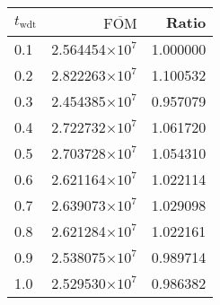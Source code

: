 \begin{tabular}{lrr}
\toprule
$t_{\mathrm{wdt}}$ & $\overline{\mathrm{FOM}}$ &    Ratio \\
\midrule
               0.1 &   2.564454$\times 10^{7}$ & 1.000000 \\
               0.2 &   2.822263$\times 10^{7}$ & 1.100532 \\
               0.3 &   2.454385$\times 10^{7}$ & 0.957079 \\
               0.4 &   2.722732$\times 10^{7}$ & 1.061720 \\
               0.5 &   2.703728$\times 10^{7}$ & 1.054310 \\
               0.6 &   2.621164$\times 10^{7}$ & 1.022114 \\
               0.7 &   2.639073$\times 10^{7}$ & 1.029098 \\
               0.8 &   2.621284$\times 10^{7}$ & 1.022161 \\
               0.9 &   2.538075$\times 10^{7}$ & 0.989714 \\
               1.0 &   2.529530$\times 10^{7}$ & 0.986382 \\
\bottomrule
\end{tabular}
